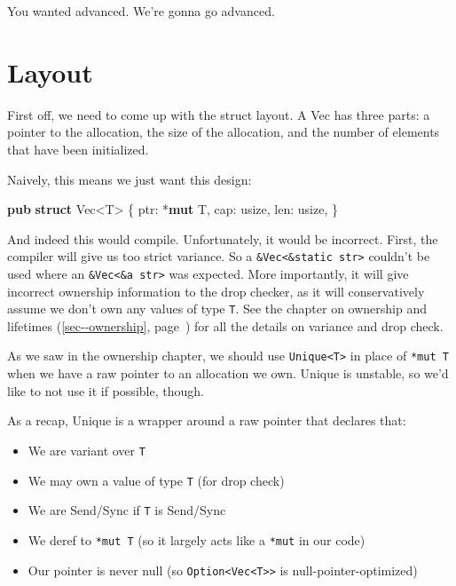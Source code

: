 \documentclass[a4paper,]{book}
\renewcommand*{\hyperref}[2][\ar]{%
  \def\ar{#2}%
  #2 (\autoref{#1}, page~\pageref{#1})}
\newenvironment{Shaded}{\begin{snugshade}}{\end{snugshade}}
\newcommand{\KeywordTok}[1]{\textcolor[rgb]{0.13,0.29,0.53}{\textbf{{#1}}}}
\newcommand{\NormalTok}[1]{{#1}}
\begin{document}
You wanted advanced. We're gonna go advanced.

\section{Layout}\label{sec--vec-layout}

First off, we need to come up with the struct layout. A Vec has three
parts: a pointer to the allocation, the size of the allocation, and the
number of elements that have been initialized.

Naively, this means we just want this design:

\begin{Shaded}
\begin{Highlighting}[]
\KeywordTok{pub} \KeywordTok{struct} \NormalTok{Vec<T> \{}
    \NormalTok{ptr: *}\KeywordTok{mut} \NormalTok{T,}
    \NormalTok{cap: usize,}
    \NormalTok{len: usize,}
\NormalTok{\}}
\end{Highlighting}
\end{Shaded}

And indeed this would compile. Unfortunately, it would be incorrect.
First, the compiler will give us too strict variance. So a
\texttt{\&Vec\textless{}\&\textquotesingle{}static\ str\textgreater{}}
couldn't be used where an
\texttt{\&Vec\textless{}\&\textquotesingle{}a\ str\textgreater{}} was
expected. More importantly, it will give incorrect ownership information
to the drop checker, as it will conservatively assume we don't own any
values of type \texttt{T}. See \hyperref[sec--ownership]{the chapter on
ownership and lifetimes} for all the details on variance and drop check.

As we saw in the ownership chapter, we should use
\texttt{Unique\textless{}T\textgreater{}} in place of \texttt{*mut\ T}
when we have a raw pointer to an allocation we own. Unique is unstable,
so we'd like to not use it if possible, though.

As a recap, Unique is a wrapper around a raw pointer that declares that:

\begin{itemize}
\itemsep1pt\parskip0pt
\item
  We are variant over \texttt{T}
\item
  We may own a value of type \texttt{T} (for drop check)
\item
  We are Send/Sync if \texttt{T} is Send/Sync
\item
  We deref to \texttt{*mut\ T} (so it largely acts like a \texttt{*mut}
  in our code)
\item
  Our pointer is never null (so
  \texttt{Option\textless{}Vec\textless{}T\textgreater{}\textgreater{}}
  is null-pointer-optimized)
\end{itemize}
\end{document}
